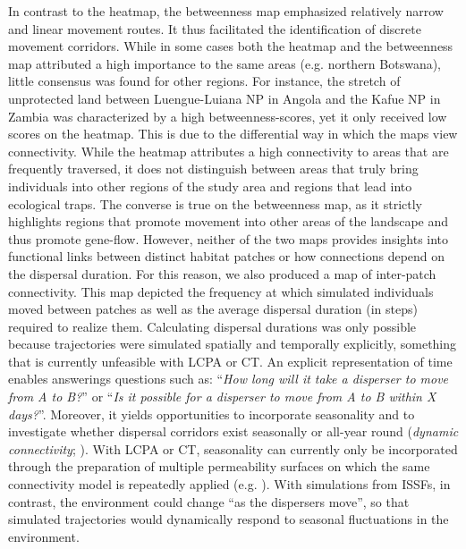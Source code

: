\documentclass[abstract=on,10pt,a4paper,bibliography=totocnumbered]{article}
\begin{document}
In contrast to the heatmap, the betweenness map emphasized relatively narrow and
linear movement routes. It thus facilitated the identification of discrete
movement corridors. While in some cases both the heatmap and the betweenness map
attributed a high importance to the same areas (e.g. northern Botswana), little
consensus was found for other regions. For instance, the stretch of unprotected
land between Luengue-Luiana NP in Angola and the Kafue NP in Zambia was
characterized by a high betweenness-scores, yet it only received low scores on
the heatmap. This is due to the differential way in which the maps view
connectivity. While the heatmap attributes a high connectivity to areas that are
frequently traversed, it does not distinguish between areas that truly bring
individuals into other regions of the study area and regions that lead into
ecological traps. The converse is true on the betweenness map, as it strictly
highlights regions that promote movement into other areas of the landscape and
thus promote gene-flow. However, neither of the two maps provides insights into
functional links between distinct habitat patches or how connections depend on
the dispersal duration. For this reason, we also produced a map of inter-patch
connectivity. This map depicted the frequency at which simulated individuals
moved between patches as well as the average dispersal duration (in steps)
required to realize them. Calculating dispersal durations was only possible
because trajectories were simulated spatially and temporally explicitly,
something that is currently unfeasible with LCPA or CT. An explicit
representation of time enables answerings questions such as: ``\textit{How long
will it take a disperser to move from A to B?}'' or ``\textit{Is it possible for
a disperser to move from A to B within X days?}''. Moreover, it yields
opportunities to incorporate seasonality and to investigate whether dispersal
corridors exist seasonally or all-year round (\textit{dynamic connectivity};
\citealp{Zeller.2020}). With LCPA or CT, seasonality can currently only be
incorporated through the preparation of multiple permeability surfaces on which
the same connectivity model is repeatedly applied (e.g. \citealp{Osipova.2019}).
With simulations from ISSFs, in contrast, the environment could change ``as the
dispersers move'', so that simulated trajectories would dynamically respond to
seasonal fluctuations in the environment.
\end{document}
